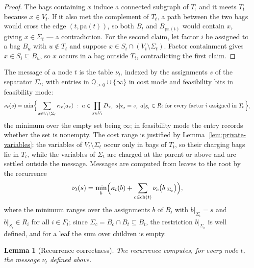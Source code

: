 \documentclass[11pt]{article}
\theoremstyle{plain}
\newtheorem{lemma}[theorem]{Lemma}
\theoremstyle{definition}
\theoremstyle{remark}
\begin{document}
\begin{proof}
The bags containing \(x\) induce a connected subgraph of \(T\), and it
meets \(T_t\) because \(x\in V_t\).  If it also met the complement of
\(T_t\), a path between the two bags would cross the edge
\((t,\mathrm{pa}(t))\), so both \(B_t\) and \(B_{\mathrm{pa}(t)}\) would
contain \(x\), giving \(x\in\Sigma_t\) --- a contradiction.  For the second
claim, let factor \(i\) be assigned to a bag \(B_u\) with \(u\notin T_t\)
and suppose \(x\in S_i\cap(V_t\setminus\Sigma_t)\).  Factor containment
gives \(x\in S_i\subseteq B_u\), so \(x\) occurs in a bag outside \(T_t\),
contradicting the first claim.
\end{proof}

The message of a node \(t\) is the table \(\nu_t\), indexed by the
assignments \(s\) of the separator \(\Sigma_t\), with entries in
\(\mathbb Q_{\ge0}\cup\{\infty\}\) in cost mode and feasibility bits in
feasibility mode:
\[
  \nu_t(s)=\min\Bigl\{\,\sum_{x\in V_t\setminus\Sigma_t}\kappa_x(a_x)\ :\
  a\in\prod_{x\in V_t}D_x,\ a|_{\Sigma_t}=s,\ a|_{S_i}\in R_i\ \text{for
  every factor }i\text{ assigned in }T_t\,\Bigr\},
\]
the minimum over the empty set being \(\infty\); in feasibility mode the
entry records whether the set is nonempty.  The cost range is justified by
Lemma~\ref{lem:private-variables}: the variables of \(V_t\setminus\Sigma_t\)
occur only in bags of \(T_t\), so their charging bags lie in \(T_t\), while
the variables of \(\Sigma_t\) are charged at the parent or above and are
settled outside the message.  Messages are computed from leaves to the root
by the recurrence
\[
  \nu_t(s)=\min_{b}\Bigl(\kappa_t(b)+\sum_{c\in\mathrm{ch}(t)}
  \nu_c\bigl(b|_{\Sigma_c}\bigr)\Bigr),
\]
where the minimum ranges over the assignments \(b\) of \(B_t\) with
\(b|_{\Sigma_t}=s\) and \(b|_{S_i}\in R_i\) for all \(i\in F_t\); since
\(\Sigma_c=B_c\cap B_t\subseteq B_t\), the restriction \(b|_{\Sigma_c}\) is
well defined, and for a leaf the sum over children is empty.

\begin{lemma}[Recurrence correctness]
\label{lem:recurrence-correctness}
The recurrence computes, for every node \(t\), the message \(\nu_t\) defined
above.
\end{lemma}
\end{document}
